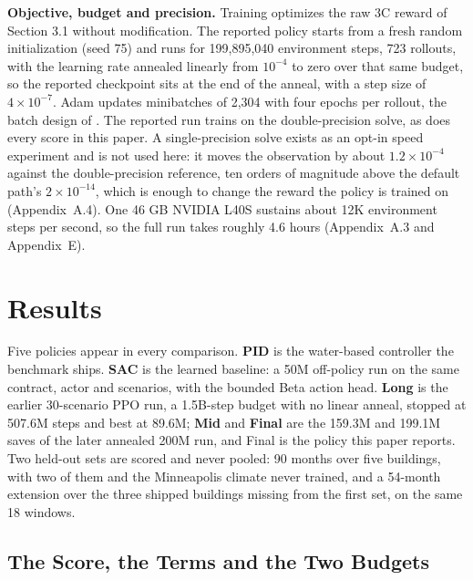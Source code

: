 \documentclass{article}
\begin{document}
\textbf{Objective, budget and precision.} Training optimizes the raw 3C reward of Section 3.1 without modification. The reported policy starts from a fresh random initialization (seed 75) and runs for 199,895,040 environment steps, 723 rollouts, with the learning rate annealed linearly from $10^{-4}$ to zero over that same budget, so the reported checkpoint sits at the end of the anneal, with a step size of $4\times10^{-7}$. Adam \citep{kingma2015adam} updates minibatches of 2,304 with four epochs per rollout, the batch design of \citet{andrychowicz2020matters}. The reported run trains on the double-precision solve, as does every score in this paper. A single-precision solve exists as an opt-in speed experiment and is not used here: it moves the observation by about $1.2\times10^{-4}$ against the double-precision reference, ten orders of magnitude above the default path's $2\times10^{-14}$, which is enough to change the reward the policy is trained on (Appendix~A.4). One 46 GB NVIDIA L40S sustains about 12K environment steps per second, so the full run takes roughly 4.6 hours (Appendix~A.3 and Appendix~E).

\section{Results}

Five policies appear in every comparison. \textbf{PID} is the water-based controller the benchmark ships. \textbf{SAC} is the learned baseline: a 50M off-policy run on the same contract, actor and scenarios, with the bounded Beta action head. \textbf{Long} is the earlier 30-scenario PPO run, a 1.5B-step budget with no linear anneal, stopped at 507.6M steps and best at 89.6M; \textbf{Mid} and \textbf{Final} are the 159.3M and 199.1M saves of the later annealed 200M run, and Final is the policy this paper reports. Two held-out sets are scored and never pooled: 90 months over five buildings, with two of them and the Minneapolis climate never trained, and a 54-month extension over the three shipped buildings missing from the first set, on the same 18 windows.

\subsection{The Score, the Terms and the Two Budgets}
\end{document}
